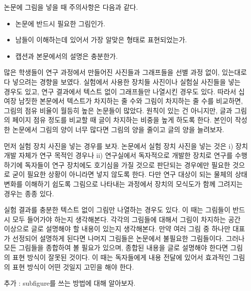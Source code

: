 \documentclass[twoside,11pt]{gshs_thesis}
\begin{document}
논문에 그림을 넣을 때 주의사항은 다음과 같다.
\begin{itemize}
\item{논문에 반드시 필요한 그림인가.}
\item{남들이 이해하는데 있어서 가장 알맞은 형태로 표현되었는가.}
\item{캡션과 본문에서의 설명은 충분한가.}
\end{itemize}
많은 학생들이 연구 과정에서 만들어진 사진들과 그래프들을 선별 과정 없이, 있는대로 다 넣으려는 경향을 보였다. 실험에서 사용한 장치들 사진이나 실험실 사진들을 넣는 경우도 있고, 연구 결과에서 텍스트 없이 그래프들만 나열시킨 경우도 있다. 따라서 십여장 남짓한 본문에서 텍스트가 차지하는 줄 수와 그림이 차지하는 줄 수를 비교하면, 그림의 점유 비율이 월등히 높은 논문들이 많았다. 원칙이 있는 건 아니지만, 글과 그림의 페이지 점유 정도를 비교할 때 글이 차지하는 비중을 높게 하도록 한다. 본인이 작성한 논문에서 그림의 양이 너무 많다면 그림의 양을 줄이고 글의 양을 늘려보자.

먼저 실험 장치 사진을 넣는 경우를 보자. 논문에서 실험 장치 사진을 넣는 것은 i) 장치 개발 자체가 연구 목적인 경우나 ii) 연구실에서 독자적으로 개발한 장치로 연구를 수행하기에 독자들이 연구 장치에도 호기심을 가질 것으로 판단되는 경우에만 필요한 것으로 굳이 필요한 상황이 아니라면 넣지 않도록 한다. 다만 연구 대상이 되는 물체의 상태 변화를 이해하기 쉽도록 그림으로 나타내는 과정에서 장치의 모식도가 함께 그려지는 경우는 종종 있다.

실험 결과를 충분한 텍스트 없이 그림만 나열하는 경우도 있다. 이 때는 그림들이 반드시 모두 들어가야 하는지 생각해본다. 각각의 그림들에 대해서 그림이 차지하는 공간 이상으로 글로 설명해야 할 내용이 있는지 생각해본다. 만약 여러 그림 중 하나만 대표가 선정되어 설명하게 된다면 나머지 그림들은 논문에서 불필요한 그림들이다. 그러나 모든 그림들을 종합하여 볼 필요가 있으며, 종합된 내용을 글로 설명해야 한다면 그림의 표현 방식이 잘못된 것이다. 이 때는 독자들에게 내용 전달에 있어서 효과적인 그림의 표현 방식이 어떤 것일지 고민을 해야 한다.

추가 : subfigure를 쓰는 방법에 대해 알아보자.
\end{document}
